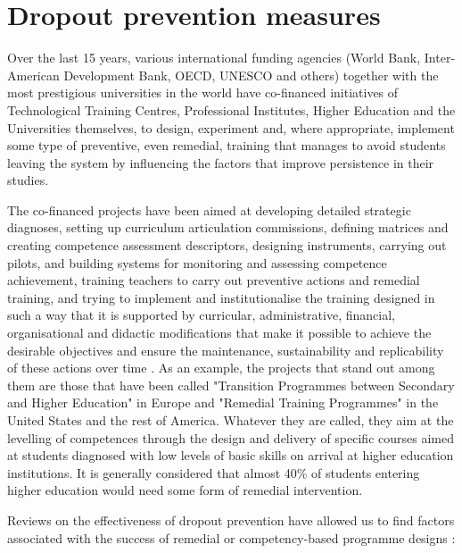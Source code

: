 \documentclass[english]{textolivre}
\begin{document}
\section{Dropout prevention measures}\label{sec-idioma}
Over the last 15 years, various international funding agencies (World Bank, Inter-American Development Bank, OECD, UNESCO and others) together with the most prestigious universities in the world have co-financed initiatives of Technological Training Centres, Professional Institutes, Higher Education and the Universities themselves, to design, experiment and, where appropriate, implement some type of preventive, even remedial, training that manages to avoid students leaving the system by influencing the factors that improve persistence in their studies.

The co-financed projects have been aimed at developing detailed strategic diagnoses, setting up curriculum articulation commissions, defining matrices and creating competence assessment descriptors, designing instruments, carrying out pilots, and building systems for monitoring and assessing competence achievement, training teachers to carry out preventive actions and remedial training, and trying to implement and institutionalise the training designed in such a way that it is supported by curricular, administrative, financial, organisational and didactic modifications that make it possible to achieve the desirable objectives and ensure the maintenance, sustainability and replicability of these actions over time \cite{fernandez_cruz_formacion_2015}. As an example, the projects that stand out among them are those that have been called "Transition Programmes between Secondary and Higher Education" in Europe and "Remedial Training Programmes" in the United States and the rest of America. Whatever they are called, they aim at the levelling of competences through the design and delivery of specific courses aimed at students diagnosed with low levels of basic skills on arrival at higher education institutions. It is generally considered that almost 40\% of students entering higher education would need some form of remedial intervention.

Reviews on the effectiveness of dropout prevention have allowed us to find factors associated with the success of remedial or competency-based programme designs \cite{rienties_longitudinal_2008}:
\end{document}
